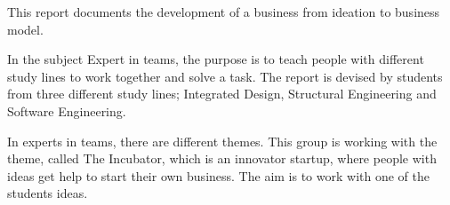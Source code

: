 This report documents the development of a business from ideation to business model.

In the subject Expert in teams, the purpose is to teach people with different study lines to work together and solve a task. The report is devised by students from three different study lines; Integrated Design, Structural Engineering and Software Engineering.

In experts in teams, there are different themes.
This group is working with the theme, called The Incubator, which is an innovator startup, where people with ideas get help to start their own business. The aim is to work with one of the students ideas.